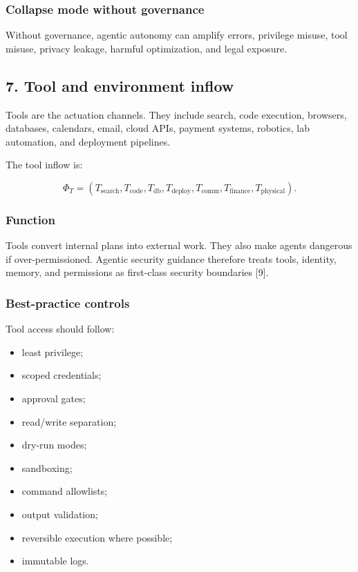 \documentclass[
  11pt,
]{article}
\providecommand{\tightlist}{%
  \setlength{\itemsep}{0pt}\setlength{\parskip}{0pt}}
\begin{document}
\subsubsection{Collapse mode without
governance}\label{collapse-mode-without-governance}

Without governance, agentic autonomy can amplify errors, privilege
misuse, tool misuse, privacy leakage, harmful optimization, and legal
exposure.

\subsection{7. Tool and environment
inflow}\label{tool-and-environment-inflow}

Tools are the actuation channels. They include search, code execution,
browsers, databases, calendars, email, cloud APIs, payment systems,
robotics, lab automation, and deployment pipelines.

The tool inflow is:

\[
\Phi_T=(T_{\text{search}},T_{\text{code}},T_{\text{db}},T_{\text{deploy}},T_{\text{comm}},T_{\text{finance}},T_{\text{physical}}).
\]

\subsubsection{Function}\label{function-6}

Tools convert internal plans into external work. They also make agents
dangerous if over-permissioned. Agentic security guidance therefore
treats tools, identity, memory, and permissions as first-class security
boundaries {[}9{]}.

\subsubsection{Best-practice controls}\label{best-practice-controls-5}

Tool access should follow:

\begin{itemize}
\tightlist
\item
  least privilege;
\item
  scoped credentials;
\item
  approval gates;
\item
  read/write separation;
\item
  dry-run modes;
\item
  sandboxing;
\item
  command allowlists;
\item
  output validation;
\item
  reversible execution where possible;
\item
  immutable logs.
\end{itemize}
\end{document}
